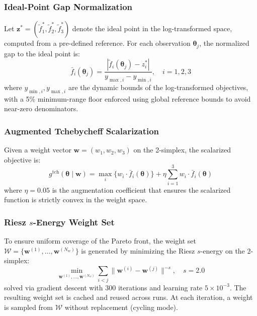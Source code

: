 \documentclass[journal]{IEEEtran}
\newcommand{\btheta}{\boldsymbol{\theta}}
\newcommand{\bw}{\boldsymbol{w}}
\newcommand{\bW}{\mathcal{W}}
\begin{document}
\subsubsection{Ideal-Point Gap Normalization}

Let $\mathbf{z}^* = (\tilde{f}_1^*, \tilde{f}_2^*, \tilde{f}_3^*)$ denote the ideal point in the log-transformed space, computed from a pre-defined reference. For each observation $\btheta_j$, the normalized gap to the ideal point is:
\begin{equation}
\bar{f}_i(\btheta_j) = \frac{|\tilde{f}_i(\btheta_j) - z_i^*|}{y_{\max,i} - y_{\min,i}}, \quad i = 1,2,3
\label{eq:normalize}
\end{equation}
where $y_{\min,i}, y_{\max,i}$ are the dynamic bounds of the log-transformed objectives, with a 5\% minimum-range floor enforced using global reference bounds to avoid near-zero denominators.

\subsubsection{Augmented Tchebycheff Scalarization}

Given a weight vector $\bw = (w_1, w_2, w_3)$ on the 2-simplex, the scalarized objective is:
\begin{equation}
g^{\text{tch}}(\btheta \mid \bw) = \max_{i} \{w_i \cdot \bar{f}_i(\btheta)\} + \eta \sum_{i=1}^{3} w_i \cdot \bar{f}_i(\btheta)
\label{eq:tcheby}
\end{equation}
where $\eta = 0.05$ is the augmentation coefficient that ensures the scalarized function is strictly convex in the weight space.

\subsubsection{Riesz $s$-Energy Weight Set}

To ensure uniform coverage of the Pareto front, the weight set $\bW = \{\bw^{(1)}, \ldots, \bw^{(N_w)}\}$ is generated by minimizing the Riesz $s$-energy on the 2-simplex:
\begin{equation}
\min_{\bw^{(1)}, \ldots, \bw^{(N_w)}} \sum_{i < j} \|\bw^{(i)} - \bw^{(j)}\|^{-s}, \quad s = 2.0
\label{eq:riesz}
\end{equation}
solved via gradient descent with 300 iterations and learning rate $5 \times 10^{-3}$. The resulting weight set is cached and reused across runs. At each iteration, a weight is sampled from $\bW$ without replacement (cycling mode).
\end{document}
